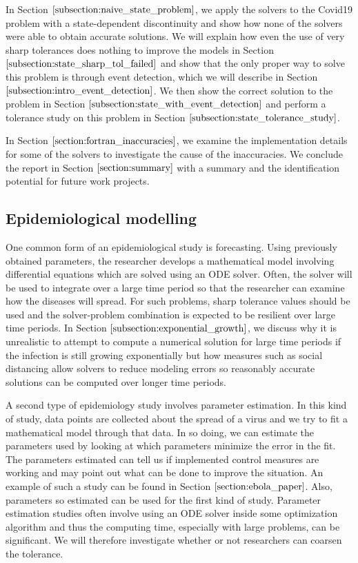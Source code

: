 In Section $\ref{subsection:naive_state_problem}$, we apply the solvers to the Covid19 problem with a state-dependent discontinuity and show how none of the solvers were able to obtain accurate solutions. We will explain how even the use of very sharp tolerances does nothing to improve the models in Section $\ref{subsection:state_sharp_tol_failed}$ and show that the only proper way to solve this problem is through event detection, which we will describe in Section $\ref{subsection:intro_event_detection}$. We then show the correct solution to the problem in Section $\ref{subsection:state_with_event_detection}$ and perform a tolerance study on this problem in Section $\ref{subsection:state_tolerance_study}$.

In Section $\ref{section:fortran_inaccuracies}$, we examine the implementation details for some of the solvers to investigate the cause of the inaccuracies. We conclude the report in Section $\ref{section:summary}$ with a summary and the identification potential for future work projects.

\subsection{Epidemiological modelling}
\label{subsection:research_papers}
One common form of an epidemiological study is forecasting. Using previously obtained parameters, the researcher develops a mathematical model involving differential equations which are solved using an ODE solver. Often, the solver will be used to integrate over a large time period so that the researcher can examine how the diseases will spread. For such problems, sharp tolerance values should be used and the solver-problem combination is expected to be resilient over large time periods. In Section $\ref{subsection:exponential_growth}$, we discuss why it is unrealistic to attempt to compute a numerical solution for large time periods if the infection is still growing exponentially but how measures such as social distancing allow solvers to reduce modeling errors so reasonably accurate solutions can be computed over longer time periods.

A second type of epidemiology study involves parameter estimation. In this kind of study, data points are collected about the spread of a virus and we try to fit a mathematical model through that data. In so doing, we can estimate the parameters used by looking at which parameters minimize the error in the fit. The parameters estimated can tell us if implemented control measures are working and may point out what can be done to improve the situation. An example of such a study can be found in Section $\ref{section:ebola_paper}$. Also, parameters so estimated can be used for the first kind of study. Parameter estimation studies often involve using an ODE solver inside some optimization algorithm and thus the computing time, especially with large problems, can be significant. We will therefore investigate whether or not researchers can coarsen the tolerance.

